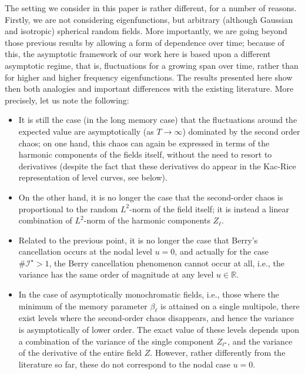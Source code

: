 \documentclass[AHL,Unicode,longabstracts,published]{cedram}
\newcommand{\clI}{\mathcal{I}}
\newcommand{\bbR}{\mathbb{R}}
\begin{document}
The setting we consider in this paper is rather different, for a number of reasons. Firstly, we are not considering eigenfunctions, but arbitrary (although Gaussian and isotropic) spherical random fields. More importantly, we are going beyond those previous results by allowing a form of dependence over time; because of this, the asymptotic framework of our work here is based upon a different asymptotic regime, that is, fluctuations for a growing span over time, rather than for higher and higher frequency eigenfunctions. The results presented here show then both analogies and important differences with the existing literature. More precisely, let us note the following:
\begin{itemize}
\item It is still the case (in the long memory case) that the fluctuations around the expected value are asymptotically (as $T\rightarrow \infty $) dominated by the second order chaos; on one hand, this chaos can again be expressed in terms of the harmonic components of the fields itself, without the need to resort to derivatives (despite the fact that these derivatives do appear in the Kac-Rice representation of level curves, see below).

\item On the other hand, it is no longer the case that the second-order chaos is proportional to the random $L^{2}$-norm of the field itself; it is instead a linear combination of $L^{2}$-norm of the harmonic components $ Z_{\ell }$.

\item Related to the previous point, it is no longer the case that Berry's cancellation occurs at the nodal level $u=0$, and actually for the case $\#
\clI^\star>1$, the Berry cancellation phenomenon cannot occur at all, i.e., the variance has the same order of magnitude at any level $u\in\bbR$.

\item In the case of asymptotically monochromatic fields, i.e., those where the minimum of the memory parameter $\beta_\ell$ is attained on a single multipole, there exist levels where the second-order chaos disappears, and hence the variance is asymptotically of lower order. The exact value of these levels depends upon a combination of the variance of the single component $Z_{\ell^\star}$, and the variance of the derivative of the entire field $Z$. However, rather differently from the literature so far, these do not correspond to the nodal case $u=0$.
\end{itemize}
\end{document}
